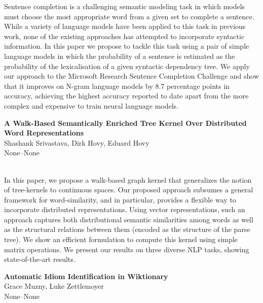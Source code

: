 \documentclass[twoside,makeidx]{book}
\begin{document}
\nopagebreak%
\noindent%
{\small Sentence completion is a challenging semantic modeling task in which models must choose the most appropriate word from a given set to complete a sentence. While a variety of language models have been applied to this task in previous work, none of the existing approaches has attempted to incorporate syntactic information. In this paper we propose to tackle this task using a pair of simple language models in which the probability of a sentence is estimated as the probability of the lexicalisation of a given syntactic dependency tree. We apply our approach to the Microsoft Research Sentence Completion Challenge and show that it improves on N-gram language models by 8.7 percentage points in accuracy, achieving the highest accuracy reported to date apart from the more complex and expensive to train neural language models.}
\par\vspace{2em}\noindent%
\begin{minipage}{\linewidth}%
\begin{center}
\textbf{\normalsize A Walk-Based Semantically Enriched Tree Kernel Over Distributed Word Representations}\\
\normalsize  Shashank Srivastava,  Dirk Hovy,  Eduard Hovy\\
{\small None--None}\\
\end{center}
\end{minipage}\\[0.5em]
\nopagebreak%
\noindent%
{\small In this paper, we propose a walk-based graph kernel that generalizes the notion of tree-kernels to continuous spaces. Our proposed approach subsumes a general framework for word-similarity, and in particular, provides a flexible way to incorporate distributed representations. Using vector representations, such an approach captures both distributional semantic similarities among words as well as the structural relations between them (encoded as the structure of the parse tree). We show an efficient formulation to compute this kernel using simple matrix operations. We present our results on three diverse NLP tasks, showing state-of-the-art results.}
\par\vspace{2em}\noindent%
\begin{minipage}{\linewidth}%
\begin{center}
\textbf{\normalsize Automatic Idiom Identification in Wiktionary}\\
\normalsize  Grace Muzny,  Luke Zettlemoyer\\
{\small None--None}\\
\end{center}
\end{minipage}\\[0.5em]
\end{document}
